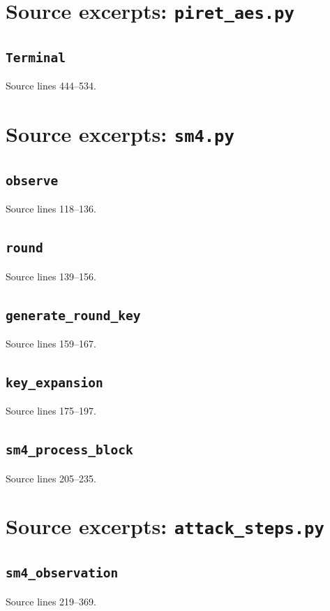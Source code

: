 \section{Source excerpts: \texttt{piret\_aes.py}}
\subsection{\texttt{Terminal}}
Source lines 444--534.
\section{Source excerpts: \texttt{sm4.py}}
\subsection{\texttt{observe}}
Source lines 118--136.
\subsection{\texttt{round}}
Source lines 139--156.
\subsection{\texttt{generate\_round\_key}}
Source lines 159--167.
\subsection{\texttt{key\_expansion}}
Source lines 175--197.
\subsection{\texttt{sm4\_process\_block}}
Source lines 205--235.
\section{Source excerpts: \texttt{attack\_steps.py}}
\subsection{\texttt{sm4\_observation}}
Source lines 219--369.

